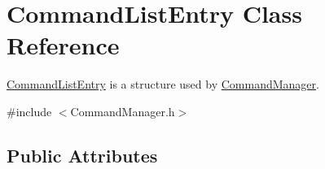 \hypertarget{struct_command_list_entry}{}\section{Command\+List\+Entry Class Reference}
\label{struct_command_list_entry}


\hyperlink{struct_command_list_entry}{Command\+List\+Entry} is a structure used by \hyperlink{class_command_manager}{Command\+Manager}.  




{\ttfamily \#include $<$Command\+Manager.\+h$>$}

\subsection*{Public Attributes}

